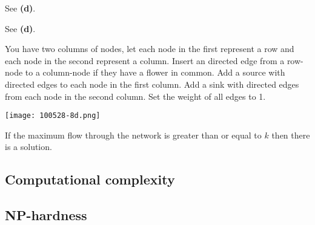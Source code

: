 \documentclass[a4paper]{article}
\newenvironment{task}[1]
{
	\begin{description}[align=right]
		\item [#1]
}{		%
	\end{description}
}
\newcommand{\taskref}[1]{\textbf{#1}}
\DeclareMathOperator{\*}{\cdot}
\begin{document}
\begin{task}{(b)}
	 See \taskref{(d)}.
\end{task}

\begin{task}{(c)}
	 See \taskref{(d)}.
\end{task}

\begin{task}{(d)}
	\qquad You have two columns of nodes, let each node in the first represent a row and each node in the second represent a column. Insert an directed edge from a row-node to a column-node if they have a flower in common. Add a source with directed edges to each node in the first column. Add a sink with directed edges from each node in the second column. Set the weight of all edges to 1.
	
	\texttt{[image: 100528-8d.png]}
	
	If the maximum flow through the network is greater than or equal to $k$ then there is a solution.
\end{task}

\subsection*{Computational complexity}

\begin{task}{9. (a)}
\end{task}

\begin{task}{(b)}
\end{task}

\begin{task}{(c)}
\end{task}

\begin{task}{(d)}
\end{task}

\begin{task}{10. (a)}
\end{task}

\begin{task}{(b)}
\end{task}

\begin{task}{(c)}
\end{task}

\subsection*{NP-hardness}
\end{document}

